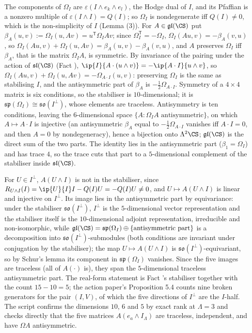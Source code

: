 The components of $\Omega_{I}$ are $\varepsilon(I\wedge e_{k}\wedge e_{l})$, the Hodge dual of $I$, and its Pfaffian is a nonzero multiple of $\varepsilon(I\wedge I) = Q(I)$; so $\Omega_{I}$ is nondegenerate iff $Q(I) \neq 0$, which is the non-simplicity of $I$ (Lemma (3)). For $A \in \mathfrak{gl}(\CS)$ put $\beta_{A}(u,v) := \Omega_{I}(u, Av) = u^{\mathsf T}\Omega_{I}Av$; since $\Omega_{I}^{\mathsf T} = -\Omega_{I}$, $\Omega_{I}(Au,v) = -\beta_{A}(v,u)$, so $\Omega_{I}(Au,v) + \Omega_{I}(u,Av) = \beta_{A}(u,v) - \beta_{A}(v,u)$, and $A$ preserves $\Omega_{I}$ iff $\beta_{A}$, that is the matrix $\Omega_{I}A$, is symmetric. By invariance of the pairing under the action of $\mathfrak{sl}(\CS)$ (Fact ), $\ip{I}{A\cdot(u\wedge v)} = -\ip{A\cdot I}{u\wedge v}$, so $\Omega_{I}(Au,v) + \Omega_{I}(u,Av) = -\Omega_{A\cdot I}(u,v)$: preserving $\Omega_{I}$ is the same as stabilising $I$, and the antisymmetric part of $\beta_{A}$ is $-\tfrac12\Omega_{A\cdot I}$. Symmetry of a $4\times 4$ matrix is six conditions, so the stabiliser is $10$-dimensional; it is $\mathfrak{sp}(\Omega_{I}) \cong \mathfrak{so}(I^{\perp})$, whose elements are traceless. Antisymmetry is ten conditions, leaving the $6$-dimensional space $\{A : \Omega_{I}A \text{ antisymmetric}\}$, on which $A \mapsto A\cdot I$ is injective (an antisymmetric $\beta_{A}$ equal to $-\tfrac12\Omega_{A\cdot I}$ vanishes iff $A\cdot I = 0$, and then $A = 0$ by nondegeneracy), hence a bijection onto $\Lambda^{2}\CS$; $\mathfrak{gl}(\CS)$ is the direct sum of the two parts. The identity lies in the antisymmetric part ($\beta_{1} = \Omega_{I}$) and has trace $4$, so the trace cuts that part to a $5$-dimensional complement of the stabiliser inside $\mathfrak{sl}(\CS)$.

For $U \in I^{\perp}$, $A(U\wedge I)$ is not in the stabiliser, since $R_{U\wedge I}(I) = \ip{U}{I}I - Q(I)U = -Q(I)U \neq 0$, and $U \mapsto A(U\wedge I)$ is linear and injective on $I^{\perp}$. Its image lies in the antisymmetric part by equivariance: under the stabiliser $\mathfrak{so}(I^{\perp})$, $I^{\perp}$ is the $5$-dimensional vector representation and the stabiliser itself is the $10$-dimensional adjoint representation, irreducible and non-isomorphic, while $\mathfrak{gl}(\CS) = \mathfrak{sp}(\Omega_{I}) \oplus \{\text{antisymmetric part}\}$ is a decomposition into $\mathfrak{so}(I^{\perp})$-submodules (both conditions are invariant under conjugation by the stabiliser); the map $U \mapsto A(U\wedge I)$ is $\mathfrak{so}(I^{\perp})$-equivariant, so by Schur's lemma its component in $\mathfrak{sp}(\Omega_{I})$ vanishes. Since the five images are traceless (all of $A(\cdot)$ is), they span the $5$-dimensional traceless antisymmetric part. The real-form statement is Fact 's stabiliser together with the count $15 - 10 = 5$; the action paper's Proposition 5.4 counts nine broken generators for the pair $(I, V)$, of which the five directions of $I^{\perp}$ are the $I$-half. The script confirms the dimensions $10$, $6$ and $5$ by exact rank at $\Lambda = 3$ and checks directly that the five matrices $A(e_{a}\wedge I_{\Lambda})$ are traceless, independent, and have $\Omega A$ antisymmetric.
